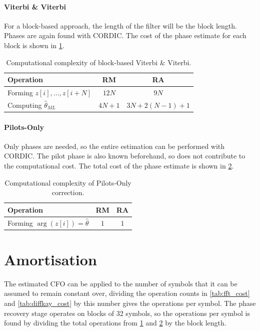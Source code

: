 \documentclass[12pt,a4paper]{article}
\begin{document}
\paragraph{Viterbi \& Viterbi}
For a block-based approach, the length of the filter will be the block length. Phases are again found with CORDIC. The cost of the phase estimate for each block is shown in \cref{tab:viterbi_cost}.
\begin{table}[H]
    \centering
    \begin{tabular}{lcc}
        \toprule
        Operation & RM & RA \\
        \midrule
        Forming \(z[i], \dots, z[i+N]\) & \(12N\) & \(9N\)\\
        Computing \(\hat{\theta}_{ML}\) & \(4N+1\) & \(3N+2(N-1)+1\)\\
        \bottomrule
    \end{tabular}
    \caption{Computational complexity of block-based Viterbi \& Viterbi.}
    \label{tab:viterbi_cost}
\end{table}
\paragraph{Pilots-Only}
Only phases are needed, so the entire estimation can be performed with CORDIC. The pilot phase is also known beforehand, so does not contribute to the computational cost. The total cost of the phase estimate is shown in \cref{tab:pilot_cost}.
\begin{table}[H]
    \centering
    \begin{tabular}{lcc}
        \toprule
        Operation & RM & RA \\
        \midrule
        Forming \(\arg(z[i]) = \hat{\theta}\) & \(1\) & \(1\)\\
        \bottomrule
    \end{tabular}
    \caption{Computational complexity of Pilots-Only correction.}
    \label{tab:pilot_cost}
\end{table}

\section{Amortisation}
The estimated CFO can be applied to the number of symbols that it can be assumed to remain constant over, dividing the operation counts in \cref{tab:fft_cost} and \cref{tab:diffkay_cost} by this number gives the operations per symbol. The phase recovery stage operates on blocks of 32 symbols, so the operations per symbol is found by dividing the total operations from \cref{tab:viterbi_cost} and \cref{tab:pilot_cost} by the block length.
\end{document}
